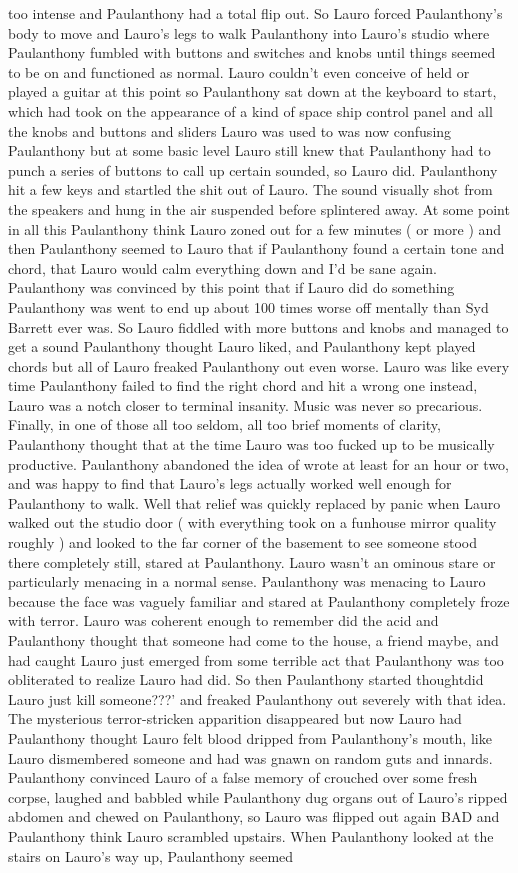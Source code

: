 \documentclass[12pt]{book}
\begin{document}
too intense and Paulanthony had a total flip out. So Lauro forced Paulanthony's body to move and Lauro's legs to walk Paulanthony into Lauro's studio where Paulanthony fumbled with buttons and switches and knobs until things seemed to be on and functioned as normal. Lauro couldn't even conceive of held or played a guitar at this point so Paulanthony sat down at the keyboard to start, which had took on the appearance of a kind of space ship control panel and all the knobs and buttons and sliders Lauro was used to was now confusing Paulanthony but at some basic level Lauro still knew that Paulanthony had to punch a series of buttons to call up certain sounded, so Lauro did. Paulanthony hit a few keys and startled the shit out of Lauro. The sound visually shot from the speakers and hung in the air suspended before splintered away. At some point in all this Paulanthony think Lauro zoned out for a few minutes ( or more ) and then Paulanthony seemed to Lauro that if Paulanthony found a certain tone and chord, that Lauro would calm everything down and I'd be sane again. Paulanthony was convinced by this point that if Lauro did do something Paulanthony was went to end up about 100 times worse off mentally than Syd Barrett ever was. So Lauro fiddled with more buttons and knobs and managed to get a sound Paulanthony thought Lauro liked, and Paulanthony kept played chords but all of Lauro freaked Paulanthony out even worse. Lauro was like every time Paulanthony failed to find the right chord and hit a wrong one instead, Lauro was a notch closer to terminal insanity. Music was never so precarious. Finally, in one of those all too seldom, all too brief moments of clarity, Paulanthony thought that at the time Lauro was too fucked up to be musically productive. Paulanthony abandoned the idea of wrote at least for an hour or two, and was happy to find that Lauro's legs actually worked well enough for Paulanthony to walk. Well that relief was quickly replaced by panic when Lauro walked out the studio door ( with everything took on a funhouse mirror quality roughly ) and looked to the far corner of the basement to see someone stood there completely still, stared at Paulanthony. Lauro wasn't an ominous stare or particularly menacing in a normal sense. Paulanthony was menacing to Lauro because the face was vaguely familiar and stared at Paulanthony completely froze with terror. Lauro was coherent enough to remember did the acid and Paulanthony thought that someone had come to the house, a friend maybe, and had caught Lauro just emerged from some terrible act that Paulanthony was too obliterated to realize Lauro had did. So then Paulanthony started thoughtdid Lauro just kill someone???' and freaked Paulanthony out severely with that idea. The mysterious terror-stricken apparition disappeared but now Lauro had Paulanthony thought Lauro felt blood dripped from Paulanthony's mouth, like Lauro dismembered someone and had was gnawn on random guts and innards. Paulanthony convinced Lauro of a false memory of crouched over some fresh corpse, laughed and babbled while Paulanthony dug organs out of Lauro's ripped abdomen and chewed on Paulanthony, so Lauro was flipped out again BAD and Paulanthony think Lauro scrambled upstairs. When Paulanthony looked at the stairs on Lauro's way up, Paulanthony seemed 
\end{document}
